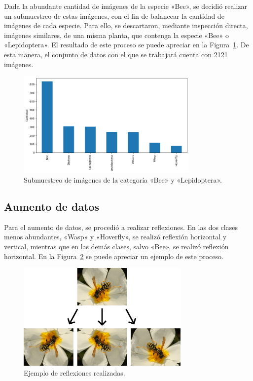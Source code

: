 Dada la abundante cantidad de imágenes de la especie «Bee», se decidió realizar un submuestreo de estas imágenes, con el fin de balancear la cantidad de imágenes de cada especie. Para ello, se descartaron, mediante inspección directa, imágenes similares, de una misma planta, que contenga la especie «Bee» o «Lepidoptera». El resultado de este proceso se puede apreciar en la Figura~\ref{fig:submuestreo}. De esta manera, el conjunto de datos con el que se trabajará cuenta con 2121 imágenes.

\begin{figure}[H]
    \centering
    \includegraphics[width=0.79\textwidth]{Figuras/submuestreo.png}
    \caption{Submuestreo de imágenes de la categoría «Bee» y «Lepidoptera».}
    \label{fig:submuestreo}
\end{figure}


\subsection{Aumento de datos}


Para el aumento de datos, se procedió a realizar reflexiones. En las dos clases menos abundantes, «Wasp» y «Hoverfly», se realizó reflexión horizontal y vertical, mientras que en las demás clases, salvo «Bee», se realizó reflexión horizontal. En la Figura~\ref{fig:reflexiones} se puede apreciar un ejemplo de este proceso.

\begin{figure}[H]
    \centering
    \includegraphics[width=0.75\textwidth]{Figuras/reflexion.png}
    \caption{Ejemplo de reflexiones realizadas.}
    \label{fig:reflexiones}
\end{figure}

